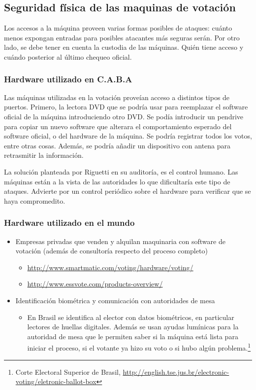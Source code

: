 \documentclass[a4,11pt]{article}
\begin{document}
\subsection{Seguridad física de las maquinas de votación}
Los accesos a la máquina proveen varias formas posibles de ataques: cuánto menos expongan
 entradas para posibles atacantes más seguras serán. Por otro lado, se debe tener en cuenta la custodia de las máquinas. Quién tiene acceso y cuándo posterior al último chequeo oficial.

\subsubsection{Hardware utilizado en C.A.B.A}
  Las máquinas utilizadas en la votación proveían acceso a distintos tipos de puertos. Primero, la lectora DVD que se podría usar para reemplazar el software oficial de la máquina introduciendo otro DVD. Se podía introducir un pendrive para copiar un nuevo software que alterara el comportamiento esperado del software oficial, o del hardware de la máquina. Se podría registrar todos los votos, entre otras cosas. Además, se podría añadir un dispositivo con antena para retrasmitir la información.

  La solución planteada por Riguetti en su auditoría, es el control humano. Las máquinas están a la vista de las autoridades lo que dificultaría este tipo de ataques. Advierte por un control periódico sobre el hardware para verificar que se haya compromedito.

\subsubsection{Hardware utilizado en el mundo}

\begin{itemize}
\item Empresas privadas que venden y alquilan maquinaria con software de votación (además de consultoría respecto del proceso completo)
  \begin{itemize}
  \item \url{http://www.smartmatic.com/voting/hardware/voting/}
  \item \url{http://www.essvote.com/products-overview/}
  \end{itemize}
\item Identificación biométrica y comunicación con autoridades de mesa
  \begin{itemize}
  \item En Brasil se identifica al elector con datos biométricos, en particular lectores de huellas digitales. Además se usan ayudas lumínicas para la autoridad de mesa que le permiten saber si la máquina está lista para iniciar el proceso, si el votante ya hizo su voto o si hubo algún problema.\footnote{Corte Electoral Superior de Brasil, \url{http://english.tse.jus.br/electronic-voting/eletronic-ballot-box}}
  \end{itemize}
\end{itemize}
\end{document}
